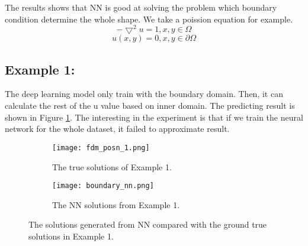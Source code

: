 \documentclass{article}
\begin{document}
The results shows that NN is good at solving the problem which boundary condition determine the whole shape. We take a poission equation for example.
\[ -\bigtriangledown^{2} u = 1, x,y \in\Omega \]
\[u(x,y) = 0, x,y \in \partial \Omega \]

\subsection{Example 1: }
The deep learning model only train with the boundary domain.
Then, it can calculate the rest of the u value based on inner domain.
The predicting result is shown in Figure \ref{fig:fdm_posn_1}.
The interesting in the experiment is that if we train the neural network for the whole dataset, it failed to approximate result. 
\begin{figure}[h]
	\begin{subfigure}{0.5\textwidth}
		\texttt{[image: fdm\_posn\_1.png]}
		\caption{The true solutions of Example 1. }
	\end{subfigure}
	\begin{subfigure}{0.5\textwidth}
	\texttt{[image: boundary\_nn.png]}
	\caption{The NN solutions from Example 1.}
	\end{subfigure}	
   \caption{The solutions generated from NN compared with the ground true solutions in Example 1. }
	\label{fig:fdm_posn_1}
\end{figure}
\end{document}
